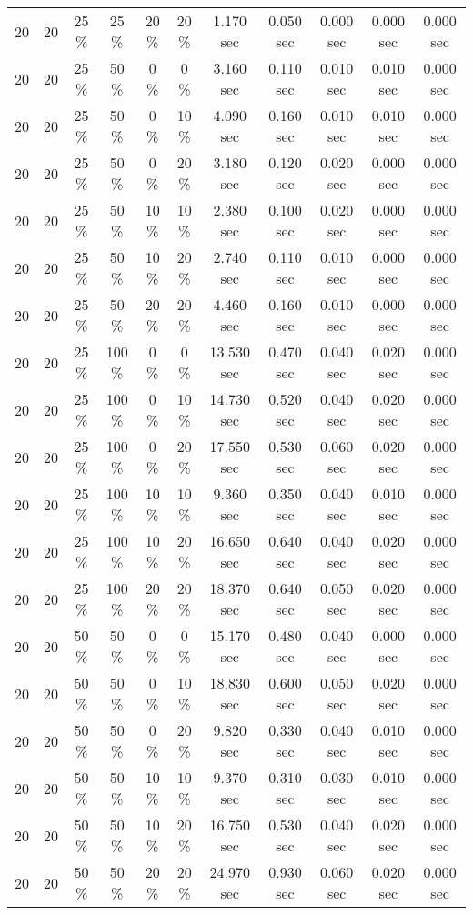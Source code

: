 \documentclass{article}
\begin{document}
\begin{longtable}[]{@{}ccccccccccc@{}}
20 & 20 & 25 \% & 25 \% & 20 \% & 20 \% & 1.170 sec & 0.050 sec & 0.000 sec & 0.000 sec & 0.000 sec \\
20 & 20 & 25 \% & 50 \% & 0 \% & 0 \% & 3.160 sec & 0.110 sec & 0.010 sec & 0.010 sec & 0.000 sec \\
20 & 20 & 25 \% & 50 \% & 0 \% & 10 \% & 4.090 sec & 0.160 sec & 0.010 sec & 0.010 sec & 0.000 sec \\
20 & 20 & 25 \% & 50 \% & 0 \% & 20 \% & 3.180 sec & 0.120 sec & 0.020 sec & 0.000 sec & 0.000 sec \\
20 & 20 & 25 \% & 50 \% & 10 \% & 10 \% & 2.380 sec & 0.100 sec & 0.020 sec & 0.000 sec & 0.000 sec \\
20 & 20 & 25 \% & 50 \% & 10 \% & 20 \% & 2.740 sec & 0.110 sec & 0.010 sec & 0.000 sec & 0.000 sec \\
20 & 20 & 25 \% & 50 \% & 20 \% & 20 \% & 4.460 sec & 0.160 sec & 0.010 sec & 0.000 sec & 0.000 sec \\
20 & 20 & 25 \% & 100 \% & 0 \% & 0 \% & 13.530 sec & 0.470 sec & 0.040 sec & 0.020 sec & 0.000 sec \\
20 & 20 & 25 \% & 100 \% & 0 \% & 10 \% & 14.730 sec & 0.520 sec & 0.040 sec & 0.020 sec & 0.000 sec \\
20 & 20 & 25 \% & 100 \% & 0 \% & 20 \% & 17.550 sec & 0.530 sec & 0.060 sec & 0.020 sec & 0.000 sec \\
20 & 20 & 25 \% & 100 \% & 10 \% & 10 \% & 9.360 sec & 0.350 sec & 0.040 sec & 0.010 sec & 0.000 sec \\
20 & 20 & 25 \% & 100 \% & 10 \% & 20 \% & 16.650 sec & 0.640 sec & 0.040 sec & 0.020 sec & 0.000 sec \\
20 & 20 & 25 \% & 100 \% & 20 \% & 20 \% & 18.370 sec & 0.640 sec & 0.050 sec & 0.020 sec & 0.000 sec \\
20 & 20 & 50 \% & 50 \% & 0 \% & 0 \% & 15.170 sec & 0.480 sec & 0.040 sec & 0.000 sec & 0.000 sec \\
20 & 20 & 50 \% & 50 \% & 0 \% & 10 \% & 18.830 sec & 0.600 sec & 0.050 sec & 0.020 sec & 0.000 sec \\
20 & 20 & 50 \% & 50 \% & 0 \% & 20 \% & 9.820 sec & 0.330 sec & 0.040 sec & 0.010 sec & 0.000 sec \\
20 & 20 & 50 \% & 50 \% & 10 \% & 10 \% & 9.370 sec & 0.310 sec & 0.030 sec & 0.010 sec & 0.000 sec \\
20 & 20 & 50 \% & 50 \% & 10 \% & 20 \% & 16.750 sec & 0.530 sec & 0.040 sec & 0.020 sec & 0.000 sec \\
20 & 20 & 50 \% & 50 \% & 20 \% & 20 \% & 24.970 sec & 0.930 sec & 0.060 sec & 0.020 sec & 0.000 sec \\

\end{longtable}
\end{document}
